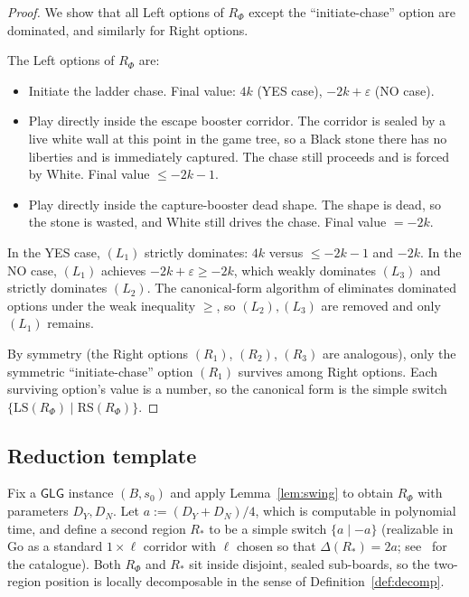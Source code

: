 \documentclass[11pt,a4paper]{amsart}
\theoremstyle{definition}
\theoremstyle{remark}
\newcommand{\LS}{\mathrm{LS}}
\newcommand{\RS}{\mathrm{RS}}
\newcommand{\GLG}{\mathsf{GLG}}
\begin{document}
\begin{proof}
We show that all Left options of $R_\Phi$ except the ``initiate-chase''
option are dominated, and similarly for Right options.

The Left options of $R_\Phi$ are:
\begin{itemize}[leftmargin=2em]
\item[$(L_1)$] Initiate the ladder chase. Final value:
  $4k$ (YES case), $-2k + \varepsilon$ (NO case).
\item[$(L_2)$] Play directly inside the escape booster corridor.
  The corridor is sealed by a live white wall at this point in the game
  tree, so a Black stone there has no liberties and is immediately
  captured. The chase still proceeds and is forced by White. Final value
  $\leq -2k - 1$.
\item[$(L_3)$] Play directly inside the capture-booster dead shape. The
  shape is dead, so the stone is wasted, and White still drives the
  chase. Final value $= -2k$.
\end{itemize}

In the YES case, $(L_1)$ strictly dominates: $4k$ versus $\leq -2k - 1$
and $-2k$. In the NO case, $(L_1)$ achieves $-2k + \varepsilon \geq -2k$,
which weakly dominates $(L_3)$ and strictly dominates $(L_2)$. The
canonical-form algorithm of \cite[Ch.~4]{BCG1982} eliminates dominated
options under the weak inequality $\geq$, so $(L_2), (L_3)$ are removed
and only $(L_1)$ remains.

By symmetry (the Right options $(R_1)$, $(R_2)$, $(R_3)$ are analogous),
only the symmetric ``initiate-chase'' option $(R_1)$ survives among Right
options. Each surviving option's value is a number, so the canonical
form is the simple switch
$\{\LS(R_\Phi) \mid \RS(R_\Phi)\}$.
\end{proof}

\subsection{Reduction template}

Fix a $\GLG$ instance $(B, s_0)$ and apply Lemma~\ref{lem:swing} to obtain
$R_\Phi$ with parameters $D_Y, D_N$. Let $a := (D_Y + D_N) / 4$, which is
computable in polynomial time, and define a second region
$R_*$ to be a simple switch $\{a \mid -a\}$ (realizable in Go as a
standard $1 \times \ell$ corridor with $\ell$ chosen so that
$\Delta(R_*) = 2a$; see~\cite[Ch.~3]{BW1994} for the catalogue). Both
$R_\Phi$ and $R_*$ sit inside disjoint, sealed sub-boards, so the
two-region position is locally decomposable in the sense of
Definition~\ref{def:decomp}.
\end{document}

